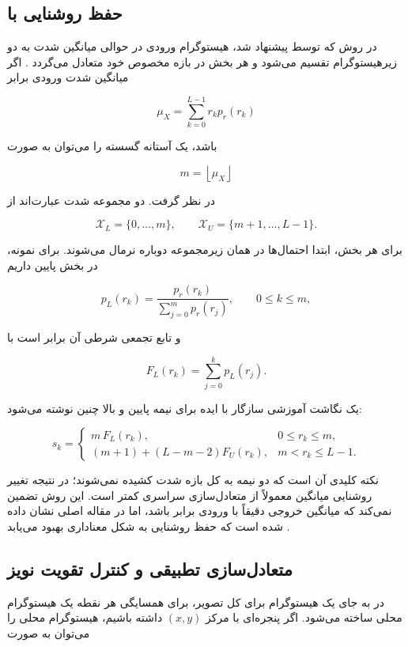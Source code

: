 \documentclass[12pt,a4paper]{article}
\begin{document}
\subsection{حفظ روشنایی با }

در روش  که توسط  پیشنهاد شد، هیستوگرام ورودی در حوالی میانگین شدت
به دو زیرهیستوگرام تقسیم می‌شود و هر بخش در بازه مخصوص خود متعادل می‌گردد
\cite{kim1997}. اگر میانگین شدت ورودی برابر

\[
\mu_X=\sum_{k=0}^{L-1} r_k p_r(r_k)
\]

باشد، یک آستانه گسسته را می‌توان به صورت

\[
 m=\left\lfloor \mu_X \right\rfloor
\]

در نظر گرفت. دو مجموعه شدت عبارت‌اند از

\[
\mathcal{X}_{L}=\{0,\ldots,m\},
\qquad
\mathcal{X}_{U}=\{m+1,\ldots,L-1\}.
\]

برای هر بخش، ابتدا احتمال‌ها در همان زیرمجموعه دوباره نرمال می‌شوند. برای نمونه، در
بخش پایین داریم

\[
 p_L(r_k)=
 \frac{p_r(r_k)}{\sum_{j=0}^{m}p_r(r_j)},
 \qquad 0\le k\le m,
\]

و تابع تجمعی شرطی آن برابر است با

\[
 F_L(r_k)=\sum_{j=0}^{k}p_L(r_j).
\]

یک نگاشت آموزشی سازگار با ایده  برای نیمه پایین و بالا چنین نوشته می‌شود:

\[
 s_k=
 \begin{cases}
 m\,F_L(r_k), & 0\le r_k\le m,\\[4pt]
 (m+1)+(L-m-2)F_U(r_k), & m<r_k\le L-1.
 \end{cases}
\]

نکته کلیدی آن است که دو نیمه به کل بازه شدت کشیده نمی‌شوند؛ در نتیجه تغییر روشنایی
میانگین معمولاً از متعادل‌سازی سراسری کمتر است. این روش تضمین نمی‌کند که میانگین خروجی
دقیقاً با ورودی برابر باشد، اما در مقاله اصلی نشان داده شده است که حفظ روشنایی به شکل
معناداری بهبود می‌یابد \cite{kim1997}.

\subsection{متعادل‌سازی تطبیقی و کنترل تقویت نویز}

در  به جای یک هیستوگرام برای کل تصویر، برای
همسایگی هر نقطه یک هیستوگرام محلی ساخته می‌شود. اگر پنجره‌ای با مرکز $(x,y)$ داشته
باشیم، هیستوگرام محلی را می‌توان به صورت
\end{document}

